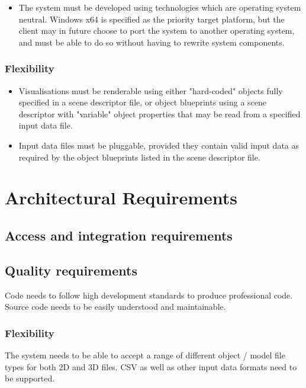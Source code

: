 \documentclass[a4paper,12pt]{article}
\begin{document}
		\begin{itemize}
			\item The system must be developed using technologies which are operating system neutral. Windows x64 is specified as the priority target platform, but the client may in future choose to port the system to another operating system, and must be able to do so without having to rewrite system components.
		\end{itemize}
	
	\subsubsection{Flexibility}
	
		\begin{itemize}
			\item Visualisations must be renderable using either "hard-coded" objects fully specified in a scene descriptor file, or object blueprints using a scene descriptor with "variable" object properties that may be read from a specified input data file.
			\item Input data files must be pluggable, provided they contain valid input data as required by the object blueprints listed in the scene descriptor file.
		\end{itemize}
\section{Architectural Requirements}	%

\subsection{Access and integration requirements}

\subsection{Quality requirements}
Code needs to follow high development standards to produce professional code. Source code needs to be easily understood and maintainable.

\subsubsection{Flexibility}
The system needs to be able to accept a range of different object / model file types for both 2D and 3D files. CSV as well as other input data formats need to be supported.
\end{document}
